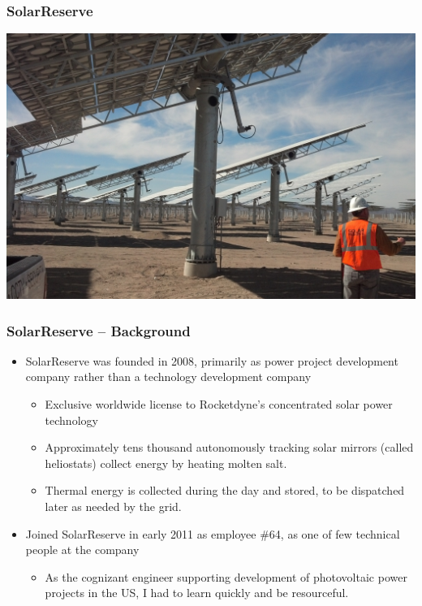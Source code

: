 \documentclass[aspectratio=169]{beamer}
\begin{document}
\begin{frame}
  \frametitle{SolarReserve}
  \center
  \includegraphics[width=.7\linewidth]{HeliostatImage.jpg}
\end{frame}

\begin{frame}
  \frametitle{SolarReserve -- Background}
  \begin{itemize}
  \item SolarReserve was founded in 2008, primarily as power project
    development company rather than a technology development company
    \begin{itemize}
    \item Exclusive worldwide license to Rocketdyne's concentrated
      solar power technology
      \item Approximately tens thousand autonomously tracking solar mirrors
        (called heliostats) collect energy by heating molten salt.
      \item Thermal energy is collected during the day and stored, to
        be dispatched later as needed by the grid.
    \end{itemize}
  \item Joined SolarReserve in early 2011 as employee \#64, as one
    of few technical people at the company
    \begin{itemize}
      \item As the cognizant engineer supporting development of
        photovoltaic power projects in the US, I had to learn quickly
        and be resourceful.
      \end{itemize}
  \end{itemize}
\end{frame}
 
\end{document}
